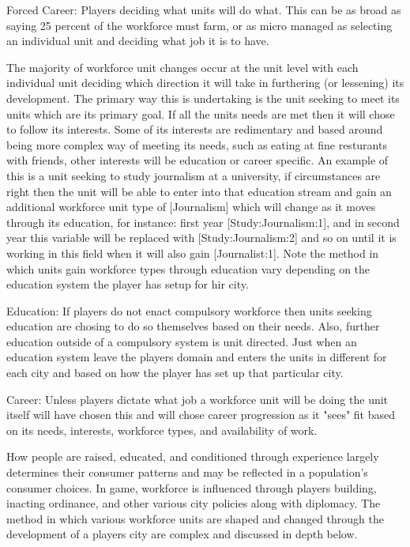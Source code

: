 Forced Career:
Players deciding what units will do what. This can be as broad as saying 25 percent of the workforce must farm, or as micro managed as selecting an individual unit and deciding what job it is to have.


The majority of workforce unit changes occur at the unit level with each individual unit deciding which direction it will take in furthering (or lessening) its development. The primary way this is undertaking is the unit seeking to meet its units which are its primary goal. If all the units needs are met then it will chose to follow its interests. Some of its interests are redimentary and based around being more complex way of meeting its needs, such as eating at fine resturants with friends, other interests will be education or career specific. An example of this is a unit seeking to study journalism at a university, if circumstances are right then the unit will be able to enter into that education stream and gain an additional workforce unit type of [Journalism] which will change as it moves through its education, for instance: first year [Study:Journalism:1], and in second year this variable will be replaced with [Study:Journalism:2] and so on until it is working in this field when it will also gain [Journalist:1]. Note the method in which units gain workforce types through education vary depending on the education system the player has setup for hir city.

Education:
If players do not enact compulsory workforce then units seeking education are chosing to do so themselves based on their needs. Also, further education outside of a compulsory system is unit directed. Just when an education system leave the players domain and enters the units in different for each city and based on how the player has set up that particular city.

Career:
Unless players dictate what job a workforce unit will be doing the unit itself will have chosen this and will chose career progression as it "sees" fit based on its needs, interests, workforce types, and availability of work.  



%
How people are raised, educated, and conditioned through experience largely determines their consumer patterns and may be reflected in a population's consumer choices. In game, workforce is influenced through players building, inacting ordinance, and other various city policies along with diplomacy. The method in which various workforce units are shaped and changed through the development of a players city are complex and discussed in depth below.
%

